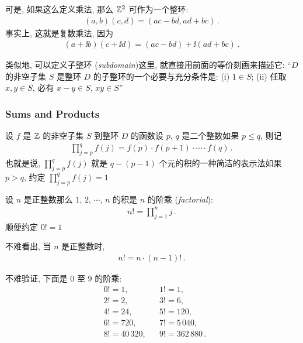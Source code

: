 \begin{remark}
    可是, 如果这么定义乘法, 那么 $\mathbb{Z}^2$ 可作为一个整环:
    \begin{align*}
        (a,b)(c,d) = (ac-bd,ad+bc)\period
    \end{align*}
    事实上, 这就是复数乘法, 因为
    \begin{align*}
        (a+ \ii b)(c+ \ii d) = (ac-bd) + \ii (ad+bc) \period
    \end{align*}
\end{remark}

\begin{remark}
    类似地, 可以定义子整环 (\textit{subdomain})\period 这里, 就直接用前面的等价刻画来描述它: ``$D$ 的非空子集 $S$ 是整环 $D$ 的子整环的一个必要与充分条件是: (i) $1 \in S$; (ii) 任取 $x,y \in S$, 必有 $x-y \in S$, $xy \in S$\period ''
\end{remark}

\subsubsection*{Sums and Products}

\begin{definition}
    设 $f$ 是 $\mathbb{Z}$ 的非空子集 $S$ 到整环 $D$ 的函数\period 设 $p$, $q$ 是二个整数\period 如果 $p \leq q$, 则记
    \begin{align*}
        \prod_{j = p}^{q} f(j) = f(p) \cdot f(p + 1) \cdot \cdots \cdot f(q)\period
    \end{align*}
    也就是说, $\prod_{j = p}^{q} f(j)$ 就是 $q - (p - 1)$ 个元的积的一种简洁的表示法\period 如果 $p > q$, 约定 $\prod_{j = p}^{q} f(j) = 1$\period
\end{definition}

\begin{definition}
    设 $n$ 是正整数\period 那么 $1$, $2$, $\cdots$, $n$ 的积是 $n$ 的阶乘 (\textit{factorial}):
    \begin{align*}
        n! = \prod_{j = 1}^{n} j \period
    \end{align*}
    顺便约定 $0! = 1$\period
\end{definition}

\begin{remark}
    不难看出, 当 $n$ 是正整数时,
    \begin{align*}
        n! = n \cdot (n-1)! \period
    \end{align*}
\end{remark}

\begin{example}
    不难验证, 下面是 $0$ 至 $9$ 的阶乘:
    \begin{align*}
         & 0! = 1,       &  & 1! = 1,               \\
         & 2! = 2,       &  & 3! = 6,               \\
         & 4! = 24,      &  & 5! = 120,             \\
         & 6! = 720,     &  & 7! = 5\,040,          \\
         & 8! = 40\,320, &  & 9! = 362\,880 \period
    \end{align*}
\end{example}

